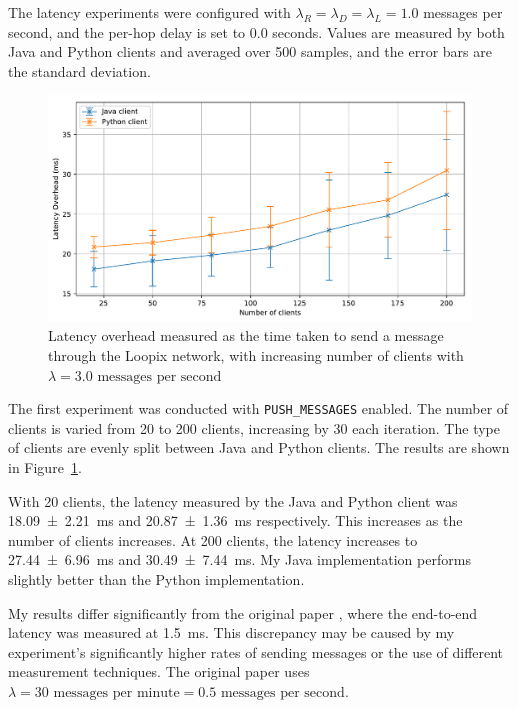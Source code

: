 \documentclass[final,dissertation.tex]{subfiles}
\begin{document}
The latency experiments were configured with $\lambda_R = \lambda_D = \lambda_L = 1.0$ messages per second, and the per-hop delay is set to $0.0$ seconds. Values are measured by both Java and Python clients and averaged over 500 samples, and the error bars are the standard deviation.

\begin{figure}[h]
	\includegraphics[width=\linewidth]{../figs/client_latency_with_python}
	\caption{Latency overhead measured as the time taken to send a message through the Loopix network, with increasing number of clients with $\lambda = 3.0\text{ messages per second}$}
	\label{fig:client_latency_2}
\end{figure}

The first experiment was conducted with \verb|PUSH_MESSAGES| enabled. The number of clients is varied from 20 to 200 clients, increasing by 30 each iteration. The type of clients are evenly split between Java and Python clients. The results are shown in Figure~\ref{fig:client_latency_2}. 

With 20 clients, the latency measured by the Java and Python client was \SI[separate-uncertainty=true]{18.09(221)}{\milli\second} and \SI[separate-uncertainty=true]{20.87(136)}{\milli\second} respectively. This increases as the number of clients increases. At 200 clients, the latency increases to \SI[separate-uncertainty=true]{27.44(696)}{\milli\second} and \SI[separate-uncertainty=true]{30.49(744)}{\milli\second}. My Java implementation performs slightly better than the Python implementation.

My results differ significantly from the original paper \cite{piotrowska2017loopix}, where the end-to-end latency was measured at \SI{1.5}{\milli\second}. This discrepancy may be caused by my experiment's significantly higher rates of sending messages or the use of different measurement techniques. The original paper uses $\lambda = 30\text{ messages per minute} = 0.5\text{ messages per second}$. 
\end{document}
